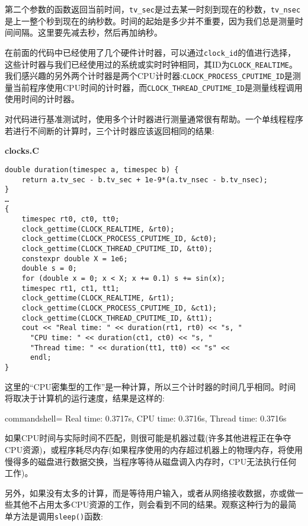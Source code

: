 第二个参数的函数返回当前时间，\texttt{tv\_sec}是过去某一时刻到现在的秒数，\texttt{tv\_nsec}是上一整个秒到现在的纳秒数。时间的起始是多少并不重要，因为我们总是测量时间间隔。这里要先减去秒，然后再加纳秒。

在前面的代码中已经使用了几个硬件计时器，可以通过\texttt{clock\_id}的值进行选择，这些计时器与我们已经使用过的系统或实时时钟相同，其ID为\texttt{CLOCK\_REALTIME}。我们感兴趣的另外两个计时器是两个CPU计时器:\texttt{CLOCK\_PROCESS\_CPUTIME\_ID}是测量当前程序使用CPU时间的计时器，而\texttt{CLOCK\_THREAD\_CPUTIME\_ID}是测量线程调用使用时间的计时器。

对代码进行基准测试时，使用多个计时器进行测量通常很有帮助。一个单线程程序若进行不间断的计算时，三个计时器应该返回相同的结果:

\noindent
\textbf{clocks.C}
\begin{lstlisting}[style=styleCXX]
double duration(timespec a, timespec b) {
	return a.tv_sec - b.tv_sec + 1e-9*(a.tv_nsec - b.tv_nsec);
}
…
{
	timespec rt0, ct0, tt0;
	clock_gettime(CLOCK_REALTIME, &rt0);
	clock_gettime(CLOCK_PROCESS_CPUTIME_ID, &ct0);
	clock_gettime(CLOCK_THREAD_CPUTIME_ID, &tt0);
	constexpr double X = 1e6;
	double s = 0;
	for (double x = 0; x < X; x += 0.1) s += sin(x);
	timespec rt1, ct1, tt1;
	clock_gettime(CLOCK_REALTIME, &rt1);
	clock_gettime(CLOCK_PROCESS_CPUTIME_ID, &ct1);
	clock_gettime(CLOCK_THREAD_CPUTIME_ID, &tt1);
	cout << "Real time: " << duration(rt1, rt0) << "s, "
	  "CPU time: " << duration(ct1, ct0) << "s, "
	  "Thread time: " << duration(tt1, tt0) << "s" <<
	  endl;
}
\end{lstlisting}

这里的“CPU密集型的工作”是一种计算，所以三个计时器的时间几乎相同。时间将取决于计算机的运行速度，结果是这样的:

\begin{tcblisting}{commandshell={}}
Real time: 0.3717s, CPU time: 0.3716s, Thread time: 0.3716s
\end{tcblisting}

如果CPU时间与实际时间不匹配，则很可能是机器过载(许多其他进程正在争夺CPU资源)，或程序耗尽内存(如果程序使用的内存超过机器上的物理内存，将使用慢得多的磁盘进行数据交换，当程序等待从磁盘调入内存时，CPU无法执行任何工作)。

另外，如果没有太多的计算，而是等待用户输入，或者从网络接收数据，亦或做一些其他不占用太多CPU资源的工作，则会看到不同的结果。观察这种行为的最简单方法是调用\texttt{sleep()}函数:

